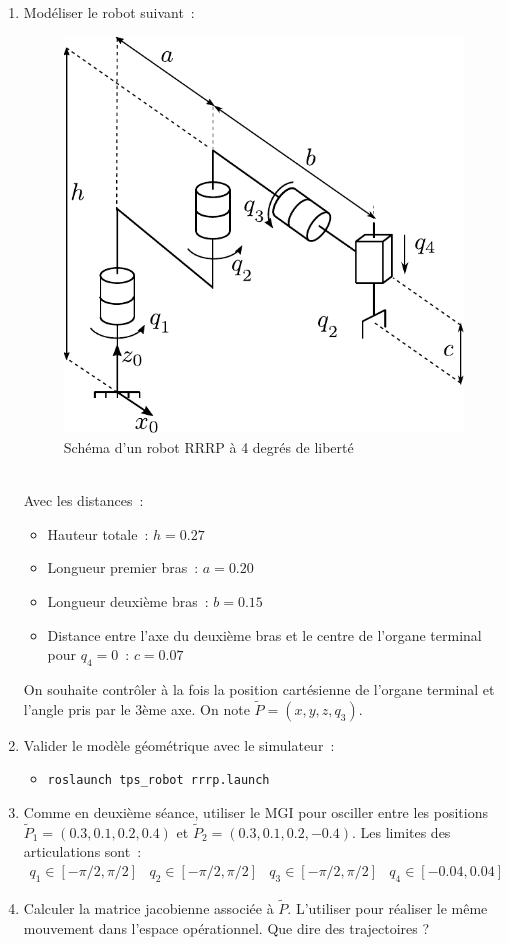 \documentclass[12pt,a4paper]{article}
\begin{document}
\begin{enumerate}
\item Modéliser le robot suivant~:
\begin{figure}[h]
\centering
\includegraphics[width=.4\linewidth]{rrrp}
\caption{Schéma d'un robot RRRP à 4 degrés de liberté}
\label{fig:3RP}
\end{figure}\\
Avec les distances~:
\begin{itemize}
\item Hauteur totale~: $h=0.27$
\item Longueur premier bras~: $a=0.20$
\item Longueur deuxième bras~: $b = 0.15$
\item Distance entre l'axe du deuxième bras et le centre de l'organe terminal pour $q_4=0$~: $c=0.07$
\end{itemize}
On souhaite contrôler à la fois la position cartésienne de l'organe terminal et l'angle pris par le 3ème axe. On note $\tilde{P} = (x,y,z,q_3)$.\\

\item Valider le modèle géométrique avec le simulateur~:
\begin{itemize}
\item \texttt{roslaunch tps\_robot rrrp.launch}
\end{itemize}
\item 
Comme en deuxième séance, utiliser le MGI pour osciller entre les positions $\tilde{P}_1=(0.3,0.1,0.2,0.4)$ et $\tilde{P}_2=(0.3,0.1,0.2,-0.4)$.
Les limites des articulations sont~:
\begin{equation*}
\begin{array}{cccc}
q_1\in[-\pi/2,\pi/2] & q_2 \in [-\pi/2,\pi/2] & q_3\in[-\pi/2,\pi/2] & q_4\in[-0.04,0.04]
\end{array}
\end{equation*}
\item Calculer la matrice jacobienne associée à $\tilde{P}$. L'utiliser pour réaliser le même mouvement dans l'espace opérationnel. Que dire des trajectoires ?
\end{enumerate}
\end{document}
